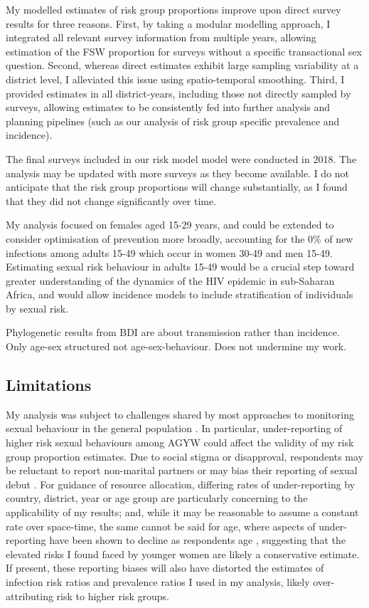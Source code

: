 \documentclass[a4paper, nobind]{templates/ociamthesis}
\begin{document}
My modelled estimates of risk group proportions improve upon direct survey results for three reasons.
First, by taking a modular modelling approach, I integrated all relevant survey information from multiple years, allowing estimation of the FSW proportion for surveys without a specific transactional sex question.
Second, whereas direct estimates exhibit large sampling variability at a district level, I alleviated this issue using spatio-temporal smoothing.
Third, I provided estimates in all district-years, including those not directly sampled by surveys, allowing estimates to be consistently fed into further analysis and planning pipelines (such as our analysis of risk group specific prevalence and incidence).

The final surveys included in our risk model model were conducted in 2018.
The analysis may be updated with more surveys as they become available.
I do not anticipate that the risk group proportions will change substantially, as I found that they did not change significantly over time.

My analysis focused on females aged 15-29 years, and could be extended to consider optimisation of prevention more broadly, accounting for the 0\% of new infections among adults 15-49 which occur in women 30-49 and men 15-49.
Estimating sexual risk behaviour in adults 15-49 would be a crucial step toward greater understanding of the dynamics of the HIV epidemic in sub-Saharan Africa, and would allow incidence models to include stratification of individuals by sexual risk.

Phylogenetic results from BDI are about transmission rather than incidence.
Only age-sex structured not age-sex-behaviour.
Does not undermine my work.

\hypertarget{limitations}{%
\subsection{Limitations}\label{limitations}}

My analysis was subject to challenges shared by most approaches to monitoring sexual behaviour in the general population \autocite{cleland2004monitoring}.
In particular, under-reporting of higher risk sexual behaviours among AGYW could affect the validity of my risk group proportion estimates.
Due to social stigma or disapproval, respondents may be reluctant to report non-marital partners \autocite{nnko2004secretive,helleringer2011reliability} or may bias their reporting of sexual debut \autocite{zaba2004age,wringe2009comparative,nguyen2022trends}.
For guidance of resource allocation, differing rates of under-reporting by country, district, year or age group are particularly concerning to the applicability of my results; and, while it may be reasonable to assume a constant rate over space-time, the same cannot be said for age, where aspects of under-reporting have been shown to decline as respondents age \autocite{glynn2011assessing}, suggesting that the elevated risks I found faced by younger women are likely a conservative estimate.
If present, these reporting biases will also have distorted the estimates of infection risk ratios and prevalence ratios I used in my analysis, likely over-attributing risk to higher risk groups.
\end{document}
